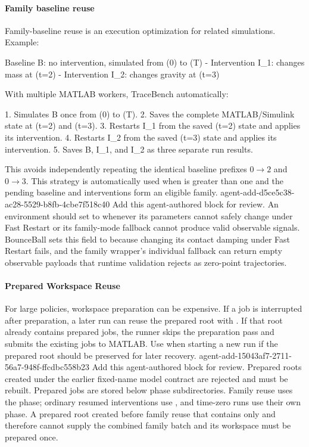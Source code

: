 \documentclass[11pt]{article}
\begin{document}
\paragraph{Family baseline reuse}
Family-baseline reuse is an execution optimization for related simulations.
Example:
\begin{DocCode}
Baseline B: no intervention, simulated from (0) to (T)
- Intervention I_1: changes mass at (t=2)
- Intervention I_2: changes gravity at (t=3)

With multiple MATLAB workers, TraceBench automatically:

1. Simulates B once from (0) to (T).
2. Saves the complete MATLAB/Simulink state at (t=2) and (t=3).
3. Restarts I_1 from the saved (t=2) state and applies its intervention.
4. Restarts I_2 from the saved (t=3) state and applies its intervention.
5. Saves B, I_1, and I_2 as three separate run results.
\end{DocCode}
This avoids independently repeating the identical baseline prefixes \(0 \rightarrow 2\) and \(0 \rightarrow 3\).
This strategy is automatically used when  is greater than one and the pending baseline and interventions form an eligible family.
\agentProposedEdit
  {agent-add-d5ce5c38-ac28-5529-b8fb-4cbe7f518c40}
  {Add this agent-authored block for review.}
  {}
  {An environment should set  to  whenever its parameters cannot safely change under Fast Restart or its family-mode fallback cannot produce valid observable signals.
BounceBall sets this field to  because changing its contact damping under Fast Restart fails, and the family wrapper's individual fallback can return empty observable payloads that runtime validation rejects as zero-point trajectories.}

\paragraph{Prepared Workspace Reuse}
For large policies, workspace preparation can be expensive.
If a job is interrupted after preparation, a later run can reuse the prepared root with .
If that root already contains prepared jobs, the runner skips the preparation pass and submits the existing jobs to MATLAB.
Use  when starting a new run if the prepared root should be preserved for later recovery.
\agentProposedEdit
  {agent-add-15043af7-2711-56a7-948f-ffcdbc558b23}
  {Add this agent-authored block for review.}
  {}
  {Prepared roots created under the earlier fixed-name model contract are rejected and must be rebuilt.}
Prepared jobs are stored below phase subdirectories. Family reuse uses the  phase; ordinary resumed interventions
use , and time-zero runs use their own phase. A prepared root created before family reuse that contains only
 and  therefore cannot supply the combined family batch and its  workspace
must be prepared once.
\end{document}
